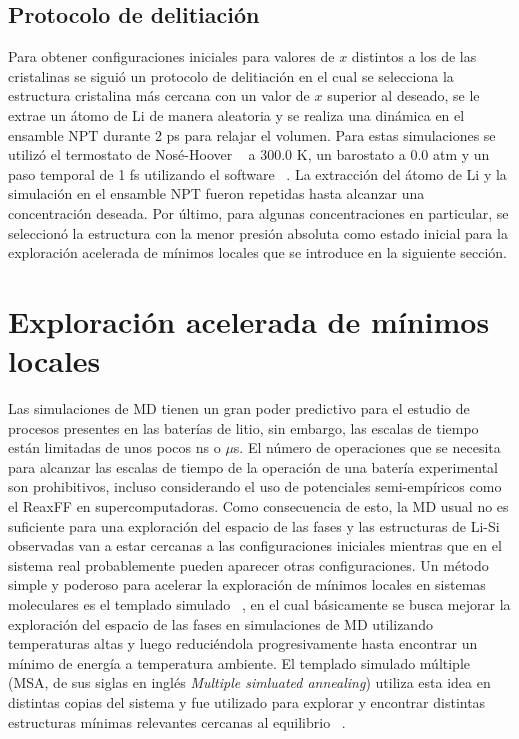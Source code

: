 \subsection{Protocolo de delitiación}

Para obtener configuraciones iniciales para valores de $x$ distintos a los de las 
cristalinas se siguió un protocolo de delitiación en el cual se selecciona la 
estructura cristalina más cercana con un valor de $x$ superior al deseado,
se le extrae un átomo de Li de manera aleatoria y se realiza una dinámica en el 
ensamble NPT durante 2 ps para relajar el volumen. Para estas simulaciones se 
utilizó el termostato de Nosé-Hoover ~\cite{nose1984a, nose1984b, hoover1985} a
300.0 K, un barostato a 0.0 atm y un paso temporal de 1 fs utilizando el
software  ~\cite{lammps1, lammps2}. La extracción del átomo de Li y
la simulación en el ensamble NPT fueron repetidas hasta alcanzar una concentración
deseada. Por último, para algunas concentraciones en particular, se seleccionó la
estructura con la menor presión absoluta como estado inicial para la exploración 
acelerada de mínimos locales que se introduce en la siguiente sección.


\section{Exploración acelerada de mínimos locales}

Las simulaciones de MD tienen un gran poder predictivo para el estudio de 
procesos presentes en las baterías de litio, sin embargo, las escalas de tiempo
están limitadas de unos pocos ns o $\mu$s. El número de operaciones que se 
necesita para alcanzar las escalas de tiempo de la operación de una batería 
experimental son prohibitivos, incluso considerando el uso de potenciales 
semi-empíricos como el ReaxFF en supercomputadoras. Como consecuencia de esto,
la MD usual no es suficiente para una exploración del espacio de las fases y las
estructuras de Li-Si observadas van a estar cercanas a las configuraciones 
iniciales mientras que en el sistema real probablemente pueden aparecer otras
configuraciones. Un método simple y poderoso para acelerar la exploración de 
mínimos locales en sistemas moleculares es el templado simulado 
~\cite{kirkpatrick1983}, en el cual básicamente se busca mejorar la exploración
del espacio de las fases en simulaciones de MD utilizando temperaturas altas y
luego reduciéndola progresivamente hasta encontrar un mínimo de energía a 
temperatura ambiente. El templado simulado múltiple (MSA, de sus siglas en inglés 
\textit{Multiple simluated annealing}) utiliza esta idea en distintas copias del 
sistema y fue utilizado para explorar y encontrar distintas estructuras mínimas 
relevantes cercanas al equilibrio ~\cite{hao2015}.

